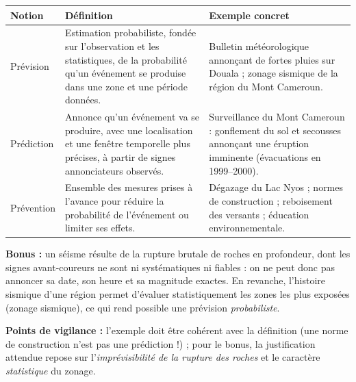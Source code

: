 \documentclass[11pt]{article}
\begin{document}
\begin{corrige}
\begin{center}
\begin{tabularx}{\linewidth}{|l|X|X|}\hline
\rowcolor{popblueL}\textbf{Notion} & \textbf{Définition} & \textbf{Exemple concret} \\ \hline
Prévision & Estimation probabiliste, fondée sur l'observation et les statistiques, de la probabilité qu'un événement se produise dans une zone et une période données. & Bulletin météorologique annonçant de fortes pluies sur Douala ; zonage sismique de la région du Mont Cameroun. \\ \hline
Prédiction & Annonce qu'un événement va se produire, avec une localisation et une fenêtre temporelle plus précises, à partir de signes annonciateurs observés. & Surveillance du Mont Cameroun : gonflement du sol et secousses annonçant une éruption imminente (évacuations en 1999--2000). \\ \hline
Prévention & Ensemble des mesures prises à l'avance pour réduire la probabilité de l'événement ou limiter ses effets. & Dégazage du Lac Nyos ; normes de construction ; reboisement des versants ; éducation environnementale. \\ \hline
\end{tabularx}
\end{center}
\textbf{Bonus :} un séisme résulte de la rupture brutale de roches en profondeur, dont les signes avant-coureurs ne sont ni systématiques ni fiables : on ne peut donc pas annoncer sa date, son heure et sa magnitude exactes. En revanche, l'histoire sismique d'une région permet d'évaluer statistiquement les zones les plus exposées (zonage sismique), ce qui rend possible une prévision \emph{probabiliste}.

\textbf{Points de vigilance :} l'exemple doit être cohérent avec la définition (une norme de construction n'est pas une prédiction !) ; pour le bonus, la justification attendue repose sur l'\emph{imprévisibilité de la rupture des roches} et le caractère \emph{statistique} du zonage.
\end{corrige}
\end{document}
